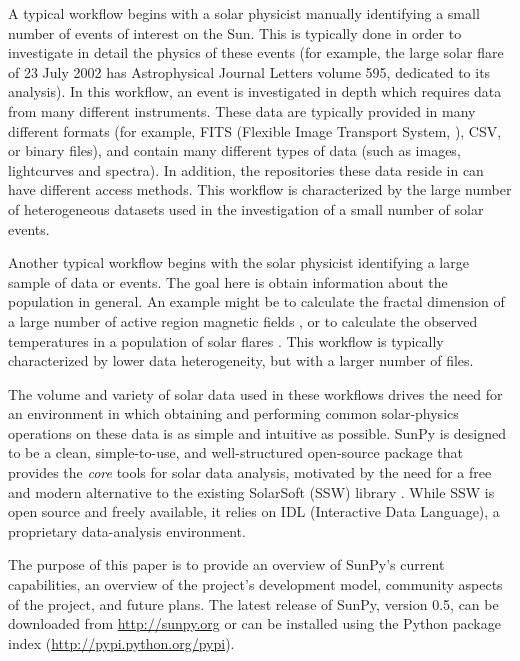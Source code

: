 A typical workflow begins with a solar physicist manually identifying
a small number of events of interest on the Sun.  This is typically
done in order to investigate in detail the physics of these events
(for example, the large solar flare of 23 July 2002 has Astrophysical
Journal Letters volume 595, dedicated to its analysis).
In this workflow, an event is investigated in depth which requires 
data from many different instruments.
These data are typically provided in many different formats (for
example, FITS (Flexible Image Transport System, \citealt{refId0}), CSV, or
binary files), and contain many different types of data (such as
images, lightcurves and spectra).  In addition, the repositories these data reside
in can have different access methods.  This workflow is characterized
by the large number of heterogeneous datasets used in the
investigation of a small number of solar events.

Another typical workflow begins with the solar physicist identifying a
large sample of data or events.  The goal here is obtain information
about the population in general.  An example might be to calculate the
fractal dimension of a large number of active region magnetic fields
\citep{2005ApJ...631..628M}, or to calculate the observed temperatures
in a population of solar flares \citep{2012ApJS..202...11R}.  This
workflow is typically characterized by lower data heterogeneity, but
with a larger number of files.

The volume and variety of solar data used in these workflows drives
the need for an environment in which obtaining and performing common
solar-physics operations on these data is as simple and intuitive as
possible.  SunPy is designed to be a clean, simple-to-use, and
well-structured open-source package that provides the \textit{core}
tools for solar data analysis, motivated by the need for a free and
modern alternative to the existing SolarSoft (SSW) library
\citep{freeland1998}. While SSW is open source and freely available,
it relies on IDL (Interactive Data Language), a proprietary
data-analysis environment.

The purpose of this paper is to provide an overview of SunPy's current
capabilities, an overview of the project's development model, community aspects of the
project, and future plans. The latest release of SunPy, version 0.5,
can be downloaded from \url{http://sunpy.org} or can be
installed using the Python package index (\url{http://pypi.python.org/pypi}).

